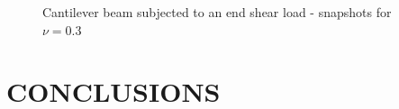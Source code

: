 \documentclass{wccm2024}
\begin{document}
\begin{figure}
    \caption{Cantilever beam subjected to an end shear load - snapshots for $\nu=0.3$}
    \label{fig:bishop-snapshot}
\end{figure}

\section{CONCLUSIONS}



\end{document}
